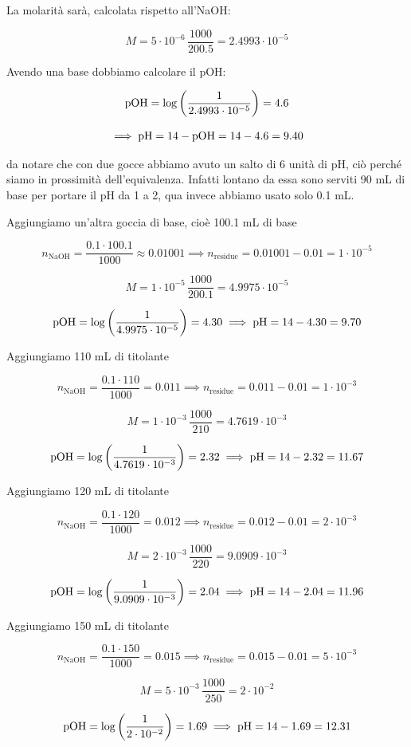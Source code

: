 La molarità sarà, calcolata rispetto all'NaOH:

$$M=5 \cdot 10^{-6} \, \frac{1000}{200.5}=2.4993 \cdot 10^{-5}$$

Avendo una base dobbiamo calcolare il pOH:

$$\rm pOH = \log \left( \frac{1}{2.4993 \cdot 10^{-5}} \right)=4.6$$

$$\implies \rm pH=14 - pOH=14-4.6=9.40$$

\E da notare che con due gocce abbiamo avuto un salto di 6 unità di pH, ciò perché siamo in prossimità dell'equivalenza. Infatti lontano da essa sono serviti 90 mL di base per portare il pH da 1 a 2, qua invece abbiamo usato solo 0.1 mL.

Aggiungiamo un'altra goccia di base, cioè 100.1 mL di base

$$n_{\text{NaOH}}=\frac{0.1 \cdot 100.1}{1000}\approx 0.01001\implies n_{\text{residue}}=0.01001-0.01 = 1 \cdot 10^{-5}$$

$$M=1 \cdot 10^{-5} \, \frac{1000}{200.1}=4.9975 \cdot 10^{-5}$$

$$\rm pOH=\log \left( \frac{1}{4.9975 \cdot 10^{-5}} \right)=4.30 \implies \rm pH=14-4.30=9.70$$

Aggiungiamo 110 mL di titolante

$$n_{\text{NaOH}}=\frac{0.1 \cdot 110}{1000}= 0.011\implies n_{\text{residue}}=0.011-0.01 = 1 \cdot 10^{-3}$$

$$M=1 \cdot 10^{-3} \, \frac{1000}{210}=4.7619 \cdot 10^{-3}$$

$$\rm pOH=\log \left( \frac{1}{4.7619 \cdot 10^{-3}} \right)=2.32 \implies \rm pH=14-2.32=11.67$$

Aggiungiamo 120 mL di titolante

$$n_{\text{NaOH}}=\frac{0.1 \cdot 120}{1000}= 0.012\implies n_{\text{residue}}=0.012-0.01 = 2 \cdot 10^{-3}$$

$$M=2 \cdot 10^{-3} \, \frac{1000}{220}=9.0909 \cdot 10^{-3}$$

$$\rm pOH=\log \left( \frac{1}{9.0909 \cdot 10^{-3}} \right)=2.04 \implies \rm pH=14-2.04=11.96$$

Aggiungiamo 150 mL di titolante

$$n_{\text{NaOH}}=\frac{0.1 \cdot 150}{1000}= 0.015\implies n_{\text{residue}}=0.015-0.01 = 5 \cdot 10^{-3}$$

$$M=5 \cdot 10^{-3} \, \frac{1000}{250}=2 \cdot 10^{-2}$$

$$\rm pOH=\log \left( \frac{1}{2 \cdot 10^{-2}} \right)=1.69 \implies \rm pH=14-1.69=12.31$$

